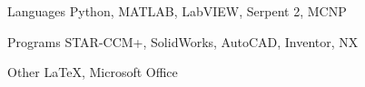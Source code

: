
\begin{cvskills}
  \cvskill
    {Languages} %
    {Python, MATLAB, LabVIEW, Serpent 2, MCNP} %

  \cvskill
    {Programs} %
    {STAR-CCM+, SolidWorks, AutoCAD, Inventor, NX} %
    
  \cvskill
    {Other} %
    {\LaTeX, Microsoft Office} %
\end{cvskills}
